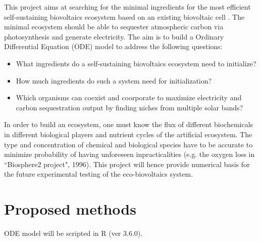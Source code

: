 \documentclass[a4paper, 11pt]{article}
\begin{document}
This project aims at searching for the minimal ingredients for the most efficient self-sustaining biovoltaics ecosystem based on an existing biovoltaic cell \autocite{mccormick2015biophotovoltaics}.  The minimal ecosystem should be able to sequester atmospheric carbon via photosynthesis and generate electricity.  The aim is to build a Ordinary Differential Equation (ODE) model to address the following questions:
\begin{itemize}
	\item What ingredients do a self-sustaining biovoltaics ecosystem need to initialize?
	\item How much ingredients do such a system need for initialization?
	\item Which organisms can coexist and coorporate to maximize electricity and carbon sequestration output by finding niches from multiple solar bands?
\end{itemize}

In order to build an ecosystem, one must know the flux of different biochemicals in different biological players and nutrient cycles of the artificial ecosystem.  The type and concentration of chemical and biological species have to be accurate to minimize probability of having unforeseen inpracticalities (e.g. the oxygen loss in ``Biosphere2 project", 1996).  This project will hence provide numerical basis for the future experimental testing of the eco-biovoltaics system.

\section{Proposed methods}
ODE model will be scripted in R (ver 3.6.0).
\end{document}
